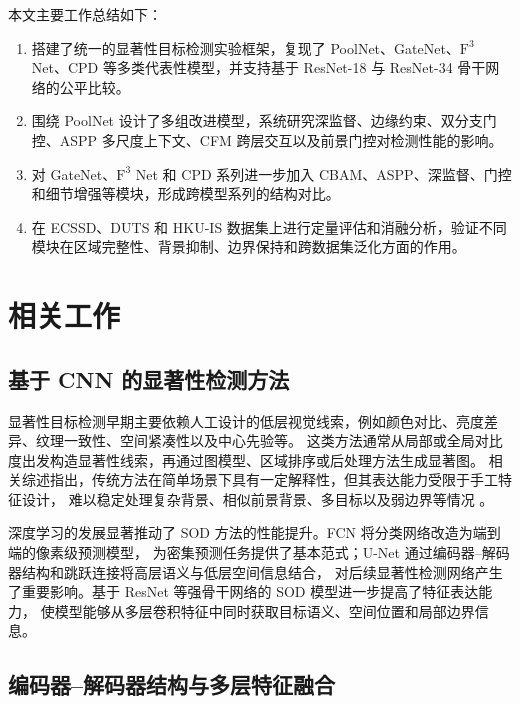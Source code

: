 \documentclass[UTF8,a4paper,10pt]{ctexart}
\begin{document}
本文主要工作总结如下：

\begin{enumerate}
  \item 搭建了统一的显著性目标检测实验框架，复现了 PoolNet、GateNet、$\text{F}^3$ Net、CPD 等多类代表性模型，并支持基于 ResNet-18 与 ResNet-34 骨干网络的公平比较。
  \item 围绕 PoolNet 设计了多组改进模型，系统研究深监督、边缘约束、双分支门控、ASPP 多尺度上下文、CFM 跨层交互以及前景门控对检测性能的影响。
  \item 对 GateNet、$\text{F}^3$ Net 和 CPD 系列进一步加入 CBAM、ASPP、深监督、门控和细节增强等模块，形成跨模型系列的结构对比。
  \item 在 ECSSD、DUTS 和 HKU-IS 数据集上进行定量评估和消融分析，验证不同模块在区域完整性、背景抑制、边界保持和跨数据集泛化方面的作用。
\end{enumerate}

\section{相关工作}

\subsection{基于 CNN 的显著性检测方法}

显著性目标检测早期主要依赖人工设计的低层视觉线索，例如颜色对比、亮度差异、纹理一致性、空间紧凑性以及中心先验等。
这类方法通常从局部或全局对比度出发构造显著性线索，再通过图模型、区域排序或后处理方法生成显著图。
相关综述指出，传统方法在简单场景下具有一定解释性，但其表达能力受限于手工特征设计，
难以稳定处理复杂背景、相似前景背景、多目标以及弱边界等情况 \cite{borji2014salient}。

深度学习的发展显著推动了 SOD 方法的性能提升。FCN \cite{long2015fully} 将分类网络改造为端到端的像素级预测模型，
为密集预测任务提供了基本范式；U-Net \cite{ronneberger2015unet} 通过编码器--解码器结构和跳跃连接将高层语义与低层空间信息结合，
对后续显著性检测网络产生了重要影响。基于 ResNet \cite{he2016deep} 等强骨干网络的 SOD 模型进一步提高了特征表达能力，
使模型能够从多层卷积特征中同时获取目标语义、空间位置和局部边界信息。

\subsection{编码器--解码器结构与多层特征融合}
\end{document}
